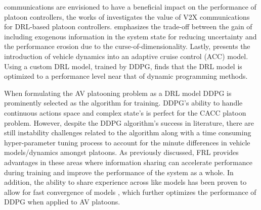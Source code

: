 communications are envisioned to have a beneficial impact on the performance of platoon
controllers, the works of \cite{LeiV2x} investigates the value of V2X communications for
DRL-based platoon controllers. \cite{LeiV2x} emphasizes the trade-off between the gain of
including exogenous information in the system state for reducing uncertainty and the
performance erosion due to the curse-of-dimensionality. Lastly, \cite{Yuan2019}
presents the introduction of vehicle dynamics into an adaptive cruise control (ACC) model.
Using a custom DRL model, trained by DDPG, \cite{Yuan2019} finds that the DRL model is optimized
to a performance level near that of dynamic programming methods.

When formulating the AV platooning problem as a DRL model DDPG is prominently selected
as the algorithm for training.  DDPG's ability to handle continuous actions space and
complex state's is perfect for the CACC platoon problem.  However, despite the DDPG
algorithm's success in literature, there are still instability challenges related to
the algorithm along with a time consuming hyper-parameter tuning process to account
for the minute differences in vehicle models/dynamics amongst platoons. As previously
discussed, FRL provides advantages in these areas where information sharing can accelerate
performance during training and improve the performance of the system as a whole. In
addition, the ability to share experience across like models has been proven to allow
for fast convergence of models \cite{Lim2020}, which further optimizes the performance
of DDPG when applied to AV platoons.